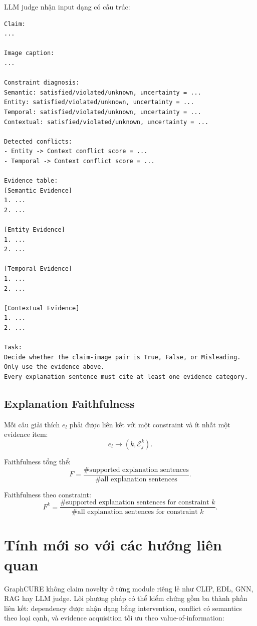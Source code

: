 \documentclass[11pt,a4paper]{article}
\begin{document}
LLM judge nhận input dạng có cấu trúc:

\begin{verbatim}
Claim:
...

Image caption:
...

Constraint diagnosis:
Semantic: satisfied/violated/unknown, uncertainty = ...
Entity: satisfied/violated/unknown, uncertainty = ...
Temporal: satisfied/violated/unknown, uncertainty = ...
Contextual: satisfied/violated/unknown, uncertainty = ...

Detected conflicts:
- Entity -> Context conflict score = ...
- Temporal -> Context conflict score = ...

Evidence table:
[Semantic Evidence]
1. ...
2. ...

[Entity Evidence]
1. ...
2. ...

[Temporal Evidence]
1. ...
2. ...

[Contextual Evidence]
1. ...
2. ...

Task:
Decide whether the claim-image pair is True, False, or Misleading.
Only use the evidence above.
Every explanation sentence must cite at least one evidence category.
\end{verbatim}

\subsection{Explanation Faithfulness}

Mỗi câu giải thích $e_l$ phải được liên kết với một constraint và ít nhất một evidence item:
\[
e_l \rightarrow (k,\mathcal{E}^{k}_j).
\]

Faithfulness tổng thể:
\[
F =
\frac{
\#\text{supported explanation sentences}
}{
\#\text{all explanation sentences}
}.
\]

Faithfulness theo constraint:
\[
F^k =
\frac{
\#\text{supported explanation sentences for constraint } k
}{
\#\text{all explanation sentences for constraint } k
}.
\]

\section{Tính mới so với các hướng liên quan}

GraphCURE không claim novelty ở từng module riêng lẻ như CLIP, EDL, GNN, RAG hay LLM judge. Lõi phương pháp có thể kiểm chứng gồm ba thành phần liên kết: dependency được nhận dạng bằng intervention, conflict có semantics theo loại cạnh, và evidence acquisition tối ưu theo value-of-information:
\end{document}
